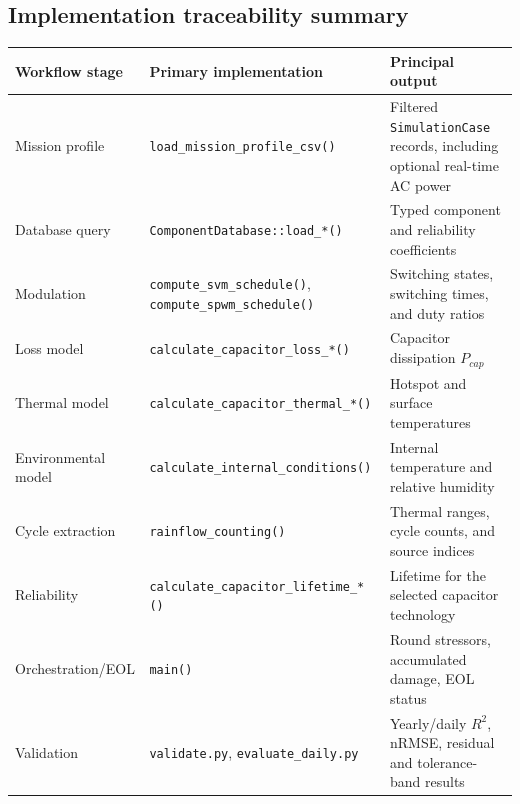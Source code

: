 \documentclass{article}
\begin{document}
\subsection{Implementation traceability summary}
\begingroup
\scriptsize
\setlength{\tabcolsep}{4pt}
\renewcommand{\arraystretch}{1.18}
\begin{longtable}{@{}p{}p{}p{}@{}}
\toprule
\textbf{Workflow stage} & \textbf{Primary implementation} & \textbf{Principal output} \\
\midrule
Mission profile & \texttt{load\_mission\_profile\_csv()} & Filtered \texttt{SimulationCase} records, including optional real-time AC power \\
Database query & \texttt{ComponentDatabase::load\_*()} & Typed component and reliability coefficients \\
Modulation & \texttt{compute\_svm\_schedule()}, \texttt{compute\_spwm\_schedule()} & Switching states, switching times, and duty ratios \\
Loss model & \texttt{calculate\_capacitor\_loss\_*()} & Capacitor dissipation $P_{cap}$ \\
Thermal model & \texttt{calculate\_capacitor\_thermal\_*()} & Hotspot and surface temperatures \\
Environmental model & \texttt{calculate\_internal\_conditions()} & Internal temperature and relative humidity \\
Cycle extraction & \texttt{rainflow\_counting()} & Thermal ranges, cycle counts, and source indices \\
Reliability & \texttt{calculate\_capacitor\_lifetime\_*()} & Lifetime for the selected capacitor technology \\
Orchestration/EOL & \texttt{main()} & Round stressors, accumulated damage, EOL status \\
Validation & \texttt{validate.py}, \texttt{evaluate\_daily.py} & Yearly/daily $R^2$, nRMSE, residual and tolerance-band results \\
\bottomrule
\end{longtable}
\endgroup
\end{document}
